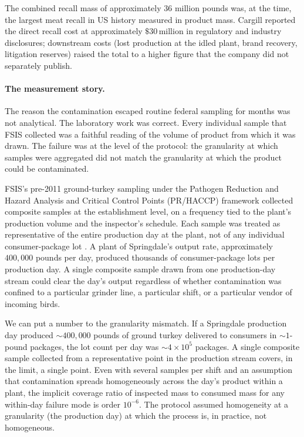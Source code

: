 The combined recall mass of approximately 36 million pounds was, at
the time, the largest meat recall in US history measured in product
mass. Cargill reported the direct recall cost at approximately
$\$30 \,\text{million}$ in regulatory and industry disclosures;
downstream costs (lost production at the idled plant, brand
recovery, litigation reserves) raised the total to a higher figure
that the company did not separately publish.

\paragraph{The measurement story.} The reason the contamination
escaped routine federal sampling for months was not analytical. The
laboratory work was correct. Every individual sample that FSIS
collected was a faithful reading of the volume of product from
which it was drawn. The failure was at the level of the protocol:
the granularity at which samples were aggregated did not match the
granularity at which the product could be contaminated.

FSIS's pre-2011 ground-turkey sampling under the Pathogen Reduction
and Hazard Analysis and Critical Control Points (PR/HACCP)
framework collected composite samples at the establishment level,
on a frequency tied to the plant's production volume and the
inspector's schedule. Each sample was treated as representative of
the entire production day at the plant, not of any individual
consumer-package lot \cite[pp.~12--18]{acc:ch01t3b-gao-fsis-sampling-2012}.
A plant of Springdale's output rate, approximately $400{,}000$ pounds
per day, produced thousands of consumer-package lots per production
day. A single composite sample drawn from one production-day stream
could clear the day's output regardless of whether contamination
was confined to a particular grinder line, a particular shift, or a
particular vendor of incoming birds.

We can put a number to the granularity mismatch. If a Springdale
production day produced $\sim 400{,}000$ pounds of ground turkey
delivered to consumers in $\sim 1$-pound packages, the lot count
per day was $\sim 4 \times 10^{5}$ packages. A single composite
sample collected from a representative point in the production
stream covers, in the limit, a single point. Even with several
samples per shift and an assumption that contamination spreads
homogeneously across the day's product within a plant, the implicit
coverage ratio of inspected mass to consumed mass for any
within-day failure mode is order $10^{-6}$. The protocol assumed
homogeneity at a granularity (the production day) at which the
process is, in practice, not homogeneous.

